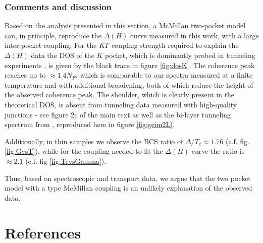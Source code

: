\documentclass[showpacs,superscriptaddress,onecolumn,prb]{revtex4}
\begin{document}
\FloatBarrier

\subsubsection{Comments and discussion}\label{sec:mcmillan_comments}

Based on the analysis presented in this section, a McMillan two-pocket model can, in principle, reproduce the $\Delta(H)$ curve measured in this work, with a large inter-pocket coupling. 
For the $K\Gamma$ coupling strength required to explain the $\Delta(H)$ data the DOS of the $K$ pocket, which is dominantly probed in tunneling experiments \cite{zhu,wang2012}, is given by the black trace in figure \ref{fig:dosK}. The coherence peak reaches up to $\approx 1.4N_F$, which is comparable to our spectra measured at a finite temperature and with additional broadening, both of which reduce the height of the observed coherence peak. The shoulder, which is clearly present in the theoretical DOS, is absent from tunneling data measured with high-quality junctions - see figure 2c of the main text as well as the bi-layer tunneling spectrum from \cite{khestanova2018unusual}, reproduced here in figure \ref{fig:geim2L}.

Additionally, in thin samples we observe the BCS ratio of $\Delta/T_c\approx 1.76$ (c.f. fig. \ref{fig:GvsT}), while for the coupling needed to fit the $\Delta(H)$ curve the ratio is $\approx 2.1$ (c.f. fig \ref{fig:TcvsGamma}).

Thus, based on spectroscopic and transport data, we argue that the two pocket model with a type McMillan coupling\cite{mcmillan} is an unlikely explanation of the observed data.

\FloatBarrier


\section*{References}


\end{document}
